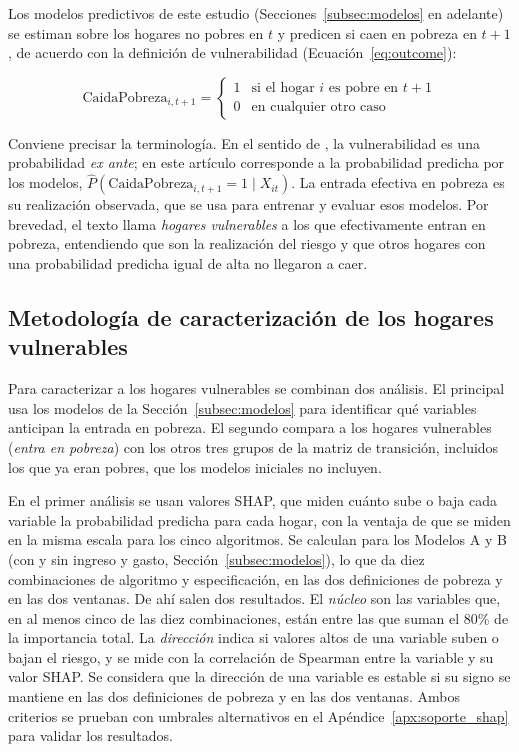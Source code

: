 \documentclass[12pt, letterpaper]{article}
\begin{document}
Los modelos predictivos de este estudio (Secciones~\ref{subsec:modelos}
en adelante) se estiman sobre los hogares no pobres en $t$ y predicen si caen en
pobreza en $t+1$, de acuerdo con la definición de vulnerabilidad
(Ecuación~\ref{eq:outcome}):

\begin{equation}
  \text{CaidaPobreza}_{i,t+1} =
  \begin{cases}
    1 & \text{si el hogar } i \text{ es pobre en } t+1 \\
    0 & \text{en cualquier otro caso}
  \end{cases}
  \label{eq:outcome}
\end{equation}

Conviene precisar la terminología. En el sentido de
\textcite{chaudhuri2002}, la vulnerabilidad es una probabilidad
\emph{ex ante}; en este artículo corresponde a la probabilidad predicha
por los modelos, $\hat{P}(\text{CaidaPobreza}_{i,t+1}=1 \mid X_{it})$. La
entrada efectiva en pobreza es su realización observada, que se usa para
entrenar y evaluar esos modelos. Por brevedad, el texto llama
\emph{hogares vulnerables} a los que efectivamente entran en pobreza,
entendiendo que son la realización del riesgo y que otros hogares con una
probabilidad predicha igual de alta no llegaron a caer.

\subsection{Metodología de caracterización de los hogares vulnerables}
\label{subsec:seleccion_perfil}

Para caracterizar a los hogares vulnerables se combinan dos análisis. El
principal usa los modelos de la Sección~\ref{subsec:modelos} para
identificar qué variables anticipan la entrada en pobreza. El segundo
compara a los hogares vulnerables (\emph{entra en pobreza}) con los otros
tres grupos de la matriz de transición, incluidos los que ya eran pobres,
que los modelos iniciales no incluyen.

En el primer análisis se usan valores SHAP, que miden cuánto sube o baja
cada variable la probabilidad predicha para cada hogar, con la ventaja 
de que se miden en la misma escala para los cinco algoritmos. 
Se calculan para los Modelos A y B (con y sin ingreso y gasto,
Sección~\ref{subsec:modelos}), lo que da diez combinaciones de algoritmo y especificación, en las dos
definiciones de pobreza y en las dos ventanas. De ahí salen dos
resultados. El \emph{núcleo} son las variables que, en al menos cinco de
las diez combinaciones, están entre las que suman el 80\% de la
importancia total. La \emph{dirección} indica si valores altos de una
variable suben o bajan el riesgo, y se mide con la correlación de
Spearman entre la variable y su valor SHAP. Se considera que la dirección
de una variable es estable si su signo se mantiene en las dos definiciones
de pobreza y en las dos ventanas. Ambos criterios se prueban con umbrales alternativos en el
Apéndice~\ref{apx:soporte_shap} para validar los resultados.
\end{document}
